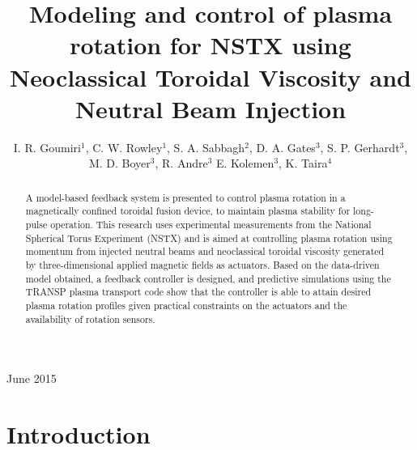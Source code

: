 \documentclass[12pt]{iopart}
\begin{document}
\title[Modeling and control of plasma rotation using NTV and NBI]{Modeling and control of plasma rotation for NSTX using Neoclassical Toroidal Viscosity and Neutral Beam Injection}

\author{I. R. Goumiri$^1$, C. W. Rowley$^1$, S. A. Sabbagh$^2$, D. A. Gates$^3$, S. P. Gerhardt$^3$, M. D. Boyer$^3$, R. Andre$^3$  E. Kolemen$^3$, K. Taira$^4$ }

\address{$^1$ Department of Mechanical and Aerospace Engineering, Princeton University, Princeton, NJ 08544, USA}
\address{$^2$ Department of Applied Physics and Applied Mathematics, Columbia University, New York, NY 10027, USA}
\address{$^3$ Princeton Plasma Physics Laboratory, Princeton, NJ 08544, USA}
\address{$^4$ Florida Center for Advanced Aero-Propulsion, Florida State University, Tallahassee, Florida 32310, USA}

\vspace{10pt}
\begin{indented}
\item[]June 2015
\end{indented}

\begin{abstract}
A model-based feedback system is presented to control plasma rotation in a
magnetically confined toroidal fusion device, to maintain plasma stability for
long-pulse operation.
%
This research uses experimental measurements from the National Spherical Torus
Experiment (NSTX) and is aimed at controlling plasma rotation using momentum
from injected neutral beams and neoclassical toroidal viscosity generated by
three-dimensional applied magnetic fields as actuators.
%
Based on the data-driven model obtained, a feedback controller is designed, and predictive simulations using the TRANSP plasma transport code show that the controller is able to attain desired plasma rotation profiles given practical constraints on the actuators and the availability of rotation sensors.
\end{abstract}

\ioptwocol


\section{Introduction}
\end{document}
